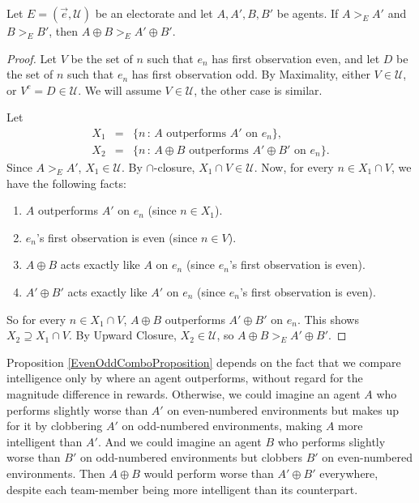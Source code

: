 \documentclass[twoside,11pt]{article}
\begin{document}
\begin{proposition}
\label{EvenOddComboProposition}
Let $E=(\vec{e},\mathscr U)$ be an electorate
and let $A,A',B,B'$ be agents.
If $A>_{E}A'$ and $B>_{E}B'$,
then $A\oplus B >_{E} A'\oplus B'$.
\end{proposition}

\begin{proof}
Let $V$ be the set of $n$ such that $e_n$ has first observation even, and let
$D$ be the set of $n$ such that $e_n$ has first observation odd.
By Maximality, either $V\in\mathscr U$, or $V^c=D\in\mathscr U$. We will assume
$V\in\mathscr U$, the other case is similar.

Let
\begin{eqnarray*}
    X_1 &=& \{n\,:\,\mbox{$A$ outperforms $A'$ on $e_n$}\},\\
    X_2 &=& \{n\,:\,\mbox{$A\oplus B$ outperforms $A'\oplus B'$ on $e_n$}\}.
\end{eqnarray*}
Since $A>_{E}A'$, $X_1\in\mathscr U$. By $\cap$-closure, $X_1\cap V\in\mathscr U$.
Now, for every $n\in X_1\cap V$, we have the following facts:
\begin{enumerate}
    \item
    $A$ outperforms $A'$ on $e_n$ (since $n\in X_1$).
    \item
    $e_n$'s first observation is even (since $n\in V$).
    \item
    $A\oplus B$ acts exactly like $A$ on $e_n$ (since $e_n$'s first observation is even).
    \item
    $A'\oplus B'$ acts exactly like $A'$ on $e_n$ (since $e_n$'s first observation is even).
\end{enumerate}
So for every $n\in X_1\cap V$, $A\oplus B$ outperforms $A'\oplus B'$ on $e_n$.
This shows $X_2\supseteq X_1\cap V$.
By Upward Closure, $X_2\in\mathscr U$, so $A\oplus B >_{E} A'\oplus B'$.
\end{proof}

Proposition \ref{EvenOddComboProposition} depends on the fact that we
compare intelligence only by where an agent outperforms,
without regard for the magnitude difference in rewards.
Otherwise, we could imagine an agent $A$ who performs slightly worse than $A'$
on even-numbered environments but makes up for it by clobbering $A'$ on
odd-numbered environments, making $A$ more intelligent than $A'$.
And we could imagine an agent $B$ who performs slightly worse than $B'$ on
odd-numbered environments but clobbers $B'$ on even-numbered environments.
Then $A\oplus B$ would perform worse than $A'\oplus B'$ everywhere, despite
each team-member being more intelligent than its counterpart.
\end{document}

